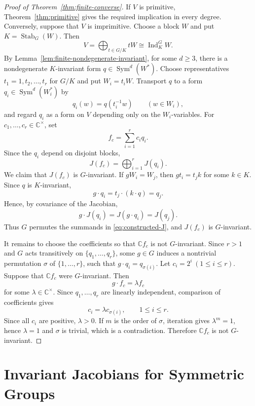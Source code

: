 \documentclass[11pt,reqno]{amsart}
\numberwithin{equation}{section}
\theoremstyle{definition}
\theoremstyle{remark}
\newcommand{\C}{\mathbb C}
\newcommand{\Sym}{\operatorname{Sym}}
\newcommand{\Ind}{\operatorname{Ind}}
\newcommand{\Stab}{\operatorname{Stab}}
\begin{document}
\begin{proof}[Proof of Theorem~\ref{thm:finite-converse}]
If $V$ is primitive, Theorem~\ref{thm:primitive} gives the required
implication in every degree. Conversely, suppose that $V$ is imprimitive.  Choose a block $W$ and
put $K=\Stab_G(W)$. Then
\[
  V=\bigoplus_{t\in G/K}tW
  \cong\Ind_K^G W.
\]
By Lemma~\ref{lem:finite-nondegenerate-invariant}, for some $d\geq3$, 
there is a nondegenerate $K$-invariant form $q\in\Sym^d(W^*)$. Choose representatives $t_1=1,t_2,\ldots,t_r$ for $G/K$ and put  $W_i=t_iW$. Transport $q$ to a form $q_i\in\Sym^d(W_i^*)$ by
\[
  q_i(w)=q(t_i^{-1}w)
  \qquad(w\in W_i),
\]
and regard $q_i$ as a form on $V$ depending only on
the $W_i$-variables.   For $c_1,\ldots,c_r\in\C^\times$, set
\begin{equation*}%
  f_c=\sum_{i=1}^r c_iq_i.
\end{equation*}
Since the $q_i$ depend on disjoint blocks,
\begin{equation}\label{eq:constructed-J}
  J(f_c)=\bigoplus_{i=1}^r J(q_i).
\end{equation}
We claim that $ J(f_c)$ is $G$-invariant.  If $gW_i=W_j$, then $gt_i=t_jk$ for some $k\in K$.  Since $q$ is $K$-invariant,
\[
  g\cdot q_i
  =
  t_j\cdot(k\cdot q)
  =
  q_j.
\]
Hence, by covariance of the Jacobian,
\[
  g\cdot J(q_i)
  =
  J(g\cdot q_i)
  =
  J(q_j).
\]
Thus $G$ permutes the summands in
\eqref{eq:constructed-J}, and $J(f_c)$ is $G$-invariant.

It remains to choose the coefficients so that $\C f_c$ is not
$G$-invariant.   Since $r>1$ and $G$ acts
transitively on $\{q_1,\dots,q_r\}$, some $g\in G$ induces a nontrivial
permutation $\sigma$ of $\{1,\ldots,r\}$, such that $g\cdot q_i=q_{\sigma(i)}$. Let $c_i=2^i\ (1\leq i\leq r)$. Suppose that $\C f_c$ were $G$-invariant.  Then
\[
  g\cdot f_c=\lambda f_c
\]
for some $\lambda\in\C^\times$.  Since $q_1,\dots,q_r$ are linearly independent,
comparison of coefficients gives
\[
  c_i=\lambda c_{\sigma(i)},\qquad 1\leq i\leq r.
\]
 Since all $c_i$ are positive, $\lambda>0$.
If $m$ is the order of $\sigma$, iteration gives $\lambda^m=1$,
hence $\lambda=1$ and $\sigma$ is trivial, which is a contradiction.  Therefore $\C f_c$ is not
$G$-invariant.
\end{proof}

\section{Invariant Jacobians for Symmetric Groups}
\label{sec:Sn}
\end{document}
